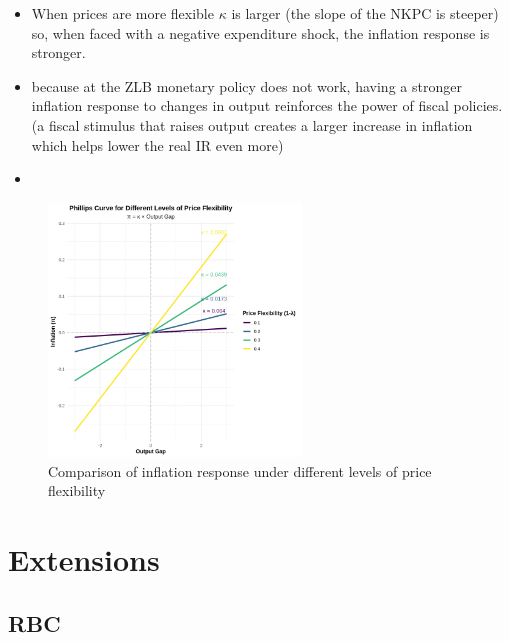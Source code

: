 \documentclass{article}
\begin{document}
\begin{flexbox}
    \begin{itemize}
        \item When prices are more flexible $\kappa$ is larger (the slope of the NKPC is steeper) so, when faced with a negative expenditure shock, the inflation response is stronger. 
        \item because at the ZLB monetary policy does not work, having a stronger inflation response to changes in output reinforces the power of fiscal policies. (a fiscal stimulus that raises output creates a larger increase in inflation which helps lower the real IR even more)
        \item 
    \end{itemize}
    \begin{figure}[H]
    \centering
    \includegraphics[width=0.6\textwidth]{Pictures/priceflex.png}
    \caption{Comparison of inflation response under different levels of price flexibility}
    \label{fig: Comparison inflation response under varying flex-price}
\end{figure}
\end{flexbox}












\section{Extensions}

\subsection{RBC}
\end{document}
